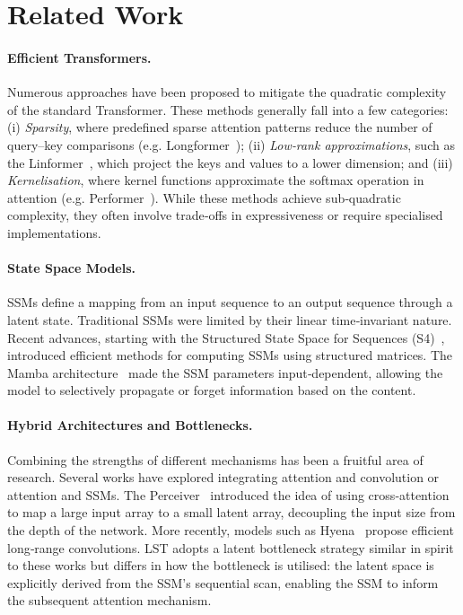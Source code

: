 \documentclass[10pt,twocolumn,letterpaper]{article}
\begin{document}
\section{Related Work}

\paragraph{Efficient Transformers.}  Numerous approaches have been proposed to mitigate the quadratic complexity of the standard Transformer.  These methods generally fall into a few categories: (i) \emph{Sparsity}, where predefined sparse attention patterns reduce the number of query–key comparisons (e.g. Longformer \cite{beltagy2020longformer}); (ii) \emph{Low‑rank approximations}, such as the Linformer \cite{wang2020linformer}, which project the keys and values to a lower dimension; and (iii) \emph{Kernelisation}, where kernel functions approximate the softmax operation in attention (e.g. Performer \cite{choromanski2020rethinking}).  While these methods achieve sub‑quadratic complexity, they often involve trade‑offs in expressiveness or require specialised implementations.

\paragraph{State Space Models.}  SSMs define a mapping from an input sequence to an output sequence through a latent state.  Traditional SSMs were limited by their linear time‑invariant nature.  Recent advances, starting with the Structured State Space for Sequences (S4) \cite{gu2021efficiently}, introduced efficient methods for computing SSMs using structured matrices.  The Mamba architecture \cite{gu2023mamba} made the SSM parameters input‑dependent, allowing the model to selectively propagate or forget information based on the content.

\paragraph{Hybrid Architectures and Bottlenecks.}  Combining the strengths of different mechanisms has been a fruitful area of research.  Several works have explored integrating attention and convolution or attention and SSMs.  The Perceiver \cite{jaegle2021perceiver} introduced the idea of using cross‑attention to map a large input array to a small latent array, decoupling the input size from the depth of the network.  More recently, models such as Hyena \cite{poli2023hyena} propose efficient long‑range convolutions.  LST adopts a latent bottleneck strategy similar in spirit to these works but differs in how the bottleneck is utilised: the latent space is explicitly derived from the SSM’s sequential scan, enabling the SSM to inform the subsequent attention mechanism.
\end{document}
